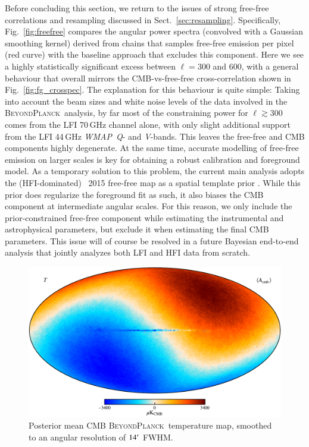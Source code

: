 \documentclass[twocolumn]{aa}
\def\WMAP{\textit{WMAP}}
\newcommand{\BP}{\textsc{BeyondPlanck}}
\begin{document}
Before concluding this section, we return to the issues of strong
free-free correlations and resampling discussed in
Sect.~\ref{sec:resampling}. Specifically, Fig.~\ref{fig:freefree}
compares the angular power spectra (convolved with a Gaussian
smoothing kernel) derived from chains that samples free-free emission
per pixel (red curve) with the baseline approach that excludes this
component. Here we see a highly statistically significant excess
between $\ell=300$ and 600, with a general behaviour that overall
mirrors the CMB-vs-free-free cross-correlation shown in
Fig.~\ref{fig:fg_crosspec}. The explanation for this behaviour is
quite simple: Taking into account the beam sizes and white noise
levels of the data involved in the \BP\ analysis, by far most of the
constraining power for $\ell\gtrsim300$ comes from the LFI 70\,GHz
channel alone, with only slight additional support from the LFI
44\,GHz \WMAP\ \textit Q- and \textit V-bands. This leaves the free-free and CMB
components highly degenerate. At the same time, accurate modelling of
free-free emission on larger scales is key for obtaining a robust
calibration and foreground model. As a temporary solution to this
problem, the current main analysis adopts the (HFI-dominated)
\Planck\ 2015 free-free map as a spatial template prior
\citep{bp13}. While this prior does regularize the foreground fit as
such, it also biases the CMB component at intermediate angular
scales. For this reason, we only include the prior-constrained
free-free component while estimating the instrumental and
astrophysical parameters, but exclude it when estimating the final CMB
parameters. This issue will of course be resolved in a future Bayesian
end-to-end analysis that jointly analyzes both LFI and HFI data from
scratch.

\begin{figure}[t]
  \center
  \includegraphics[width=0.9\linewidth]{figs/BP_cmb_BP10_I_MEAN_w18_n1024_cb_c-planck.pdf}
  \caption{Posterior mean CMB \BP\ temperature map, smoothed to an
    angular resolution of $14\arcm$ FWHM.}\label{fig:cmb_with_dipole}
\end{figure}
\end{document}
